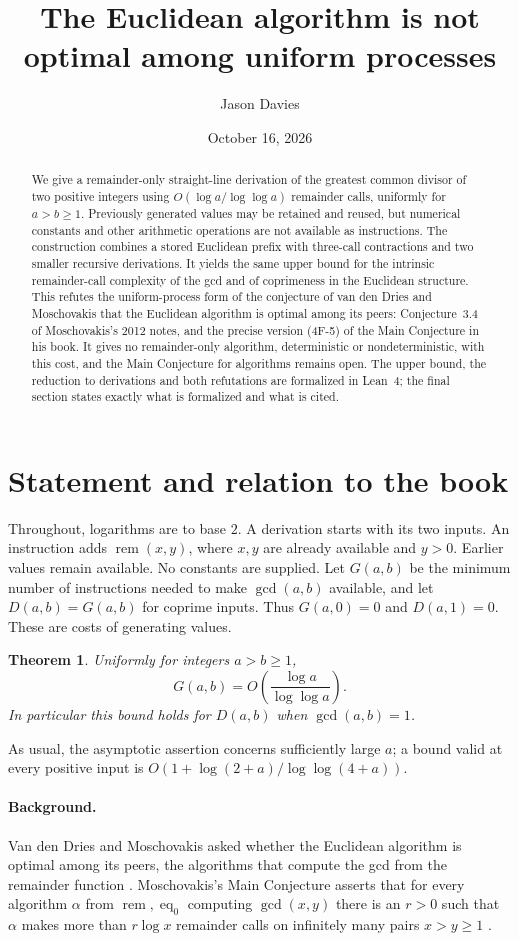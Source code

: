 \documentclass[11pt]{article}
\title{The Euclidean algorithm is not optimal among uniform processes}
\author{Jason Davies}
\date{October 16, 2026}
\newtheorem{theorem}{Theorem}
\newcommand{\rem}{\operatorname{rem}}
\newcommand{\eq}{\operatorname{eq}}
\begin{document}
\maketitle
\begin{abstract}
We give a remainder-only straight-line derivation of the greatest common divisor
of two positive integers using $O(\log a/\log\log a)$ remainder calls, uniformly
for $a>b\geq1$. Previously generated values may be retained and reused, but
numerical constants and other arithmetic operations are not available as
instructions. The construction combines a stored Euclidean prefix with
three-call contractions and two smaller recursive derivations. It yields the
same upper bound for the intrinsic remainder-call complexity of the gcd and of
coprimeness in the Euclidean structure. This refutes the uniform-process form
of the conjecture of van den Dries and Moschovakis that the Euclidean algorithm
is optimal among its peers: Conjecture~3.4 of Moschovakis's 2012 notes, and the
precise version (4F-5) of the Main Conjecture in his book. It gives no
remainder-only algorithm, deterministic or nondeterministic, with this cost, and
the Main Conjecture for algorithms remains open. The upper bound, the reduction to derivations and both
refutations are formalized in Lean~4; the final section states exactly what is
formalized and what is cited.
\end{abstract}

\section{Statement and relation to the book}
Throughout, logarithms are to base $2$. A derivation starts with its two inputs.
An instruction adds $\rem(x,y)$, where $x,y$ are already available and $y>0$.
Earlier values remain available. No constants are supplied.
Let $G(a,b)$ be the minimum number of instructions needed to make $\gcd(a,b)$
available, and let $D(a,b)=G(a,b)$ for coprime inputs. Thus $G(a,0)=0$ and
$D(a,1)=0$. These are costs of generating values.

\begin{theorem}\label{thm:main}
Uniformly for integers $a>b\geq1$,
\[
G(a,b)=O\left(\frac{\log a}{\log\log a}\right).
\]
In particular this bound holds for $D(a,b)$ when $\gcd(a,b)=1$.
\end{theorem}
As usual, the asymptotic assertion concerns sufficiently large $a$; a bound
valid at every positive input is $O(1+\log(2+a)/\log\log(4+a))$.

\paragraph{Background.}
Van den Dries and Moschovakis asked whether the Euclidean algorithm is optimal
among its peers, the algorithms that compute the gcd from the remainder
function \cite{vddm2004}. Moschovakis's Main Conjecture asserts that for every
algorithm $\alpha$ from $\rem,\eq_0$ computing $\gcd(x,y)$ there is an $r>0$
such that $\alpha$ makes more than $r\log x$ remainder calls on infinitely many
pairs $x>y\geq1$ \cite[p.~2]{moschovakis2019}.
\end{document}
